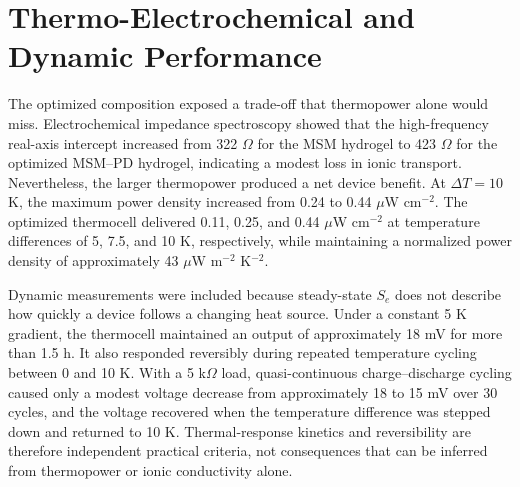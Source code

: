 \documentclass[a4paper,12pt]{report}
\begin{document}
\section{Thermo-Electrochemical and Dynamic Performance}

The optimized composition exposed a trade-off that thermopower alone would
miss. Electrochemical impedance spectroscopy showed that the high-frequency
real-axis intercept increased from 322 $\Omega$ for the MSM hydrogel to
423 $\Omega$ for the optimized MSM--PD hydrogel, indicating a modest loss in
ionic transport. Nevertheless, the larger thermopower produced a net device
benefit. At $\Delta T=10$ K, the maximum power density increased from
0.24 to 0.44 $\mu$W cm$^{-2}$. The optimized thermocell delivered
0.11, 0.25, and 0.44 $\mu$W cm$^{-2}$ at temperature differences of
5, 7.5, and 10 K, respectively, while maintaining a normalized power density
of approximately 43 $\mu$W m$^{-2}$ K$^{-2}$.

Dynamic measurements were included because steady-state $S_e$ does not
describe how quickly a device follows a changing heat source. Under a constant
5 K gradient, the thermocell maintained an output of approximately 18 mV for
more than 1.5 h. It also responded reversibly during repeated temperature
cycling between 0 and 10 K. With a 5 k$\Omega$ load, quasi-continuous
charge--discharge cycling caused only a modest voltage decrease from
approximately 18 to 15 mV over 30 cycles, and the voltage recovered when the
temperature difference was stepped down and returned to 10 K. Thermal-response
kinetics and reversibility are therefore independent practical criteria, not
consequences that can be inferred from thermopower or ionic conductivity alone.



\end{document}

